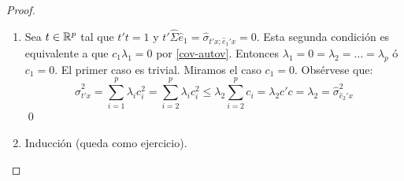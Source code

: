 \documentclass[twoside]{article}
\begin{document}
\begin{proof}
\begin{enumerate}
\item Sea $t \in \mathbb{R}^p$ tal que $t't=1$ y $t' \hat{\Sigma}\hat{e}_1 = \hat{\sigma}_{t'x;\hat{e}_1'x}=0$. Esta segunda condición es equivalente a que $c_1 \lambda_1 = 0$ por \eqref{cov-autov}.
Entonces $\lambda_1 = 0 = \lambda_2 = \dots = \lambda_p$ ó $c_1 = 0$.
El primer caso es trivial. Miramos el caso $c_1 = 0$.
Obsérvese que:
\[ \hat{\sigma}_{t'x}^2 = \sum_{i=1}^p \lambda_i c_i^2 = \sum_{i=2}^p \lambda_i c_i^2 \leq \lambda_2 \sum_{i=2}^p c_i = \lambda_2 c'c = \lambda_2 = \hat{\sigma}_{\hat{e}_2'x}^2\]
\qed

\item Inducción (queda como ejercicio).
\end{enumerate}
\end{proof}
\end{document}
